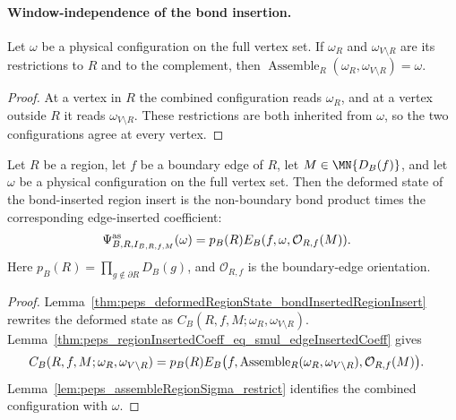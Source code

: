 \paragraph{Window-independence of the bond insertion.}

\begin{lemma}
    \label{lem:peps_assembleRegionSigma_restrict}
    \leanok
    Let $\omega$ be a physical configuration on the full vertex set. If
    $\omega_R$ and $\omega_{V\setminus R}$ are its restrictions to $R$ and
    to the complement, then
    $\operatorname{Assemble}_R(\omega_R,\omega_{V\setminus R})=\omega$.
\end{lemma}
\begin{proof}
    \leanok
    At a vertex in $R$ the combined configuration reads $\omega_R$, and at a
    vertex outside $R$ it reads $\omega_{V\setminus R}$. These restrictions
    are both inherited from $\omega$, so the two configurations agree at every
    vertex.
\end{proof}

\begin{lemma}
    \label{thm:peps_deformedRegionStateAssembled_bondInserted_eq_smul_edgeInsertedCoeff}
    \leanok
    Let $R$ be a region, let $f$ be a boundary edge of $R$, let
    $M\in\MN{D_B(f)}$, and let $\omega$ be a physical configuration on the
    full vertex set. Then the deformed state of the bond-inserted
    region insert is the non-boundary bond product times the corresponding
    edge-inserted coefficient:
    \begin{align}
        \Psi^{\mathrm{as}}_{B,R,I_{B,R,f,M}}(\omega)
         & =p_B(R)
        E_B(f,\omega,\mathcal O_{R,f}(M)).
        \notag
    \end{align}
    Here $p_B(R)=\prod_{g\notin\partial R}D_B(g)$, and $\mathcal O_{R,f}$ is
    the boundary-edge orientation.
\end{lemma}
\begin{proof}
    \leanok
    Lemma~\ref{thm:peps_deformedRegionState_bondInsertedRegionInsert}
    rewrites the deformed state as
    $C_B(R,f,M;\omega_R,\omega_{V\setminus R})$.
    Lemma~\ref{thm:peps_regionInsertedCoeff_eq_smul_edgeInsertedCoeff}
    gives
    \begin{align}
        C_B(R,f,M;\omega_R,\omega_{V\setminus R})
         & =p_B(R)
        E_B\bigl(f,\operatorname{Assemble}_R
        (\omega_R,\omega_{V\setminus R}),\mathcal O_{R,f}(M)\bigr).
        \notag
    \end{align}
    Lemma~\ref{lem:peps_assembleRegionSigma_restrict} identifies the combined
    configuration with $\omega$.
\end{proof}

